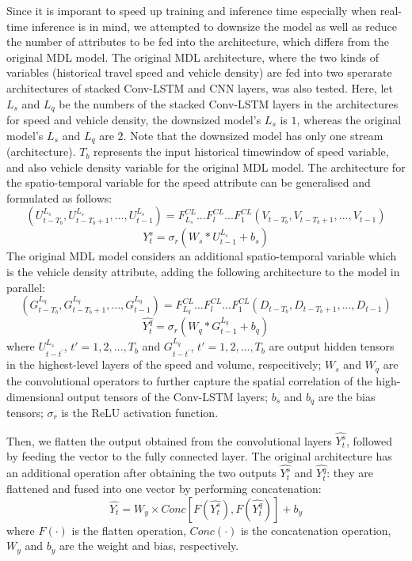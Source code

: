 \documentclass[11pt]{uonthesis}
\begin{document}
Since it is imporant to speed up training and inference time especially when real-time inference is in mind, we attempted to downsize the model as well as reduce the number of attributes to be fed into the architecture, which differs from the original MDL model. The original MDL architecture, where the two kinds of variables (historical travel speed and vehicle density) are fed into two sperarate architectures of stacked Conv-LSTM and CNN layers, was also tested. Here, let $L_s$ and $L_q$ be the numbers of the stacked Conv-LSTM layers in the architectures for speed and vehicle density, the downsized model's $L_s$ is $1$, whereas the original model's $L_s$ and $L_q$ are $2$. Note that the downsized model has only one stream (architecture). $T_b$ represents the input historical timewindow of speed variable, and also vehicle density variable for the original MDL model. The architecture for the spatio-temporal variable for the speed attribute can be generalised and formulated as follows:
\[ (U^{L_s}_{t-T_b}, U^{L_s}_{t-T_b+1},..., U^{L_s}_{t-1}) = F^{CL}_{L_s}...F^{CL}_{l}...F^{CL}_{1} (V_{t-T_b}, V_{t-T_b+1},..., V_{t-1}) \]
\[ \hat{Y^s_{t}} = {\sigma}_r (W_s\ast{U^{L_s}_{t-1}} + b_s) \]
The original MDL model considers an additional spatio-temporal variable which is the vehicle density attribute, adding the following architecture to the model in parallel:
\[ (G^{L_q}_{t-T_b}, G^{L_q}_{t-T_b+1},...,G^{L_q}_{t-1}) = F^{CL}_{L_q}...F^{CL}_{l}...F^{CL}_{1} (D_{t-T_b}, D_{t-T_b+1},..., D_{t-1}) \]
\[ \hat{Y^q_{t}} = {\sigma}_r (W_q\ast{G^{L_q}_{t-1}} + b_q) \]
where $U^{L_s}_{t-t^{\prime}}$, $t\prime = 1, 2,..., T_b$ and $G^{L_q}_{t-t^{\prime}}$, $t\prime = 1, 2,..., T_b$ are output hidden tensors in the highest-level layers of the speed and volume, respecitively; $W_s$ and $W_q$ are the convolutional operators to further capture the spatial correlation of the high-dimensional output tensors of the Conv-LSTM layers; $b_s$ and $b_q$ are the bias tensors; $\sigma_r$ is the ReLU activation function.

Then, we flatten the output obtained from the convolutional layers $\hat{Y^{s}_t}$, followed by feeding the vector to the fully connected layer. The original architecture has an additional operation after obtaining the two outputs $\hat{Y^{s}_t}$ and $\hat{Y^q_t}$: they are flattened and fused into one vector by performing concatenation:
\[ \hat{Y_t} = W_y \times Conc[F(\hat{Y^s_t}), F(\hat{Y^q_t})] + b_y\]
where $F(\cdot)$ is the flatten operation, $Conc(\cdot)$ is the concatenation operation, $W_y$ and $b_y$ are the weight and bias, respectively. %
\end{document}
